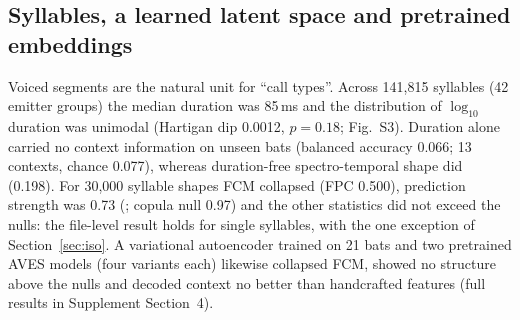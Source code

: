 \subsection{Syllables, a learned latent space and pretrained embeddings}\label{sec:syll}
Voiced segments are the natural unit for ``call types''. Across 141,815 syllables (42 emitter groups) the median duration was 85\,ms and the distribution of $\log_{10}$ duration was unimodal (Hartigan dip 0.0012, $p=0.18$; Fig.~S3). Duration alone carried no context information on unseen bats (balanced accuracy 0.066; 13 contexts, chance 0.077), whereas duration-free spectro-temporal shape did (0.198). For 30,000 syllable shapes FCM collapsed (FPC 0.500), prediction strength was 0.73 (; copula null 0.97) and the other statistics did not exceed the nulls: the file-level result holds for single syllables, with the one exception of Section~\ref{sec:iso}. A variational autoencoder trained on 21 bats and two pretrained AVES models (four variants each) likewise collapsed FCM, showed no structure above the nulls and decoded context no better than handcrafted features (full results in Supplement Section~4).


